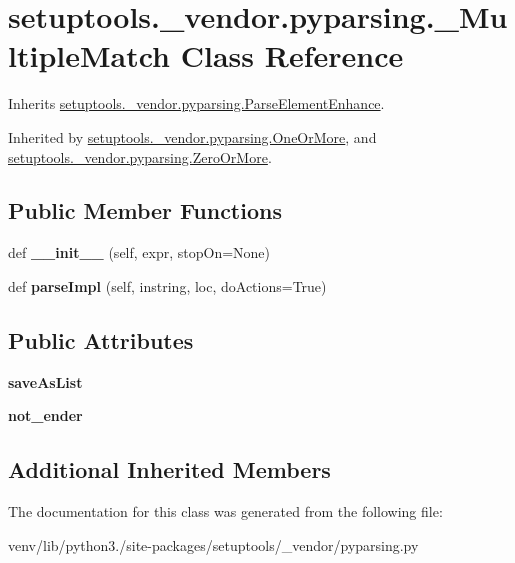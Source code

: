 \hypertarget{classsetuptools_1_1__vendor_1_1pyparsing_1_1___multiple_match}{}\section{setuptools.\+\_\+vendor.\+pyparsing.\+\_\+\+Multiple\+Match Class Reference}
\label{classsetuptools_1_1__vendor_1_1pyparsing_1_1___multiple_match}


Inherits \hyperlink{classsetuptools_1_1__vendor_1_1pyparsing_1_1_parse_element_enhance}{setuptools.\+\_\+vendor.\+pyparsing.\+Parse\+Element\+Enhance}.



Inherited by \hyperlink{classsetuptools_1_1__vendor_1_1pyparsing_1_1_one_or_more}{setuptools.\+\_\+vendor.\+pyparsing.\+One\+Or\+More}, and \hyperlink{classsetuptools_1_1__vendor_1_1pyparsing_1_1_zero_or_more}{setuptools.\+\_\+vendor.\+pyparsing.\+Zero\+Or\+More}.

\subsection*{Public Member Functions}
\begin{DoxyCompactItemize}
\item 
\mbox{\label{classsetuptools_1_1__vendor_1_1pyparsing_1_1___multiple_match_a26334a65340c9c7968899af11df6ca0e}} 
def {\bfseries \+\_\+\+\_\+init\+\_\+\+\_\+} (self, expr, stop\+On=None)
\item 
\mbox{\label{classsetuptools_1_1__vendor_1_1pyparsing_1_1___multiple_match_a54ef7a66f36ea38bb55c94f094174888}} 
def {\bfseries parse\+Impl} (self, instring, loc, do\+Actions=True)
\end{DoxyCompactItemize}
\subsection*{Public Attributes}
\begin{DoxyCompactItemize}
\item 
\mbox{\label{classsetuptools_1_1__vendor_1_1pyparsing_1_1___multiple_match_a5ad2986e516fe2b06dcda98bea4b40cb}} 
{\bfseries save\+As\+List}
\item 
\mbox{\label{classsetuptools_1_1__vendor_1_1pyparsing_1_1___multiple_match_a389ceb816e9197295e6915dd8b2940a5}} 
{\bfseries not\+\_\+ender}
\end{DoxyCompactItemize}
\subsection*{Additional Inherited Members}


The documentation for this class was generated from the following file\+:\begin{DoxyCompactItemize}
\item 
venv/lib/python3./site-\/packages/setuptools/\+\_\+vendor/pyparsing.\+py\end{DoxyCompactItemize}

